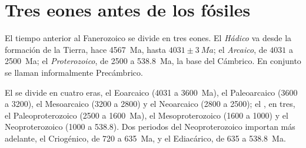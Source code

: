 \section{Tres eones antes de los fósiles}\label{sec:b2:precambrian-earth:eons}

\begin{definition}\label{def:b2:precambrian-earth:eons}
El tiempo anterior al Fanerozoico se divide en tres eones. El \emph{Hádico}
va desde la formación de la Tierra, hace \qty{4567}{Ma}, hasta $4031 \pm \qty{3}{Ma}$; el
\emph{Arcaico}, de $4031$ a \qty{2500}{Ma}; el
\emph{Proterozoico}, de 2500 a \qty{538.8}{Ma}, la base del Cámbrico.
En conjunto se llaman informalmente Precámbrico.
\end{definition}

El  se divide en cuatro eras, el Eoarcaico (4031 a \qty{3600}{Ma}), el Paleoarcaico (3600
a 3200), el Mesoarcaico (3200 a 2800) y el Neoarcaico (2800 a 2500); el , en tres,
el Paleoproterozoico (2500 a \qty{1600}{Ma}), el Mesoproterozoico (1600 a 1000) y el
Neoproterozoico (1000 a 538.8). Dos periodos del Neoproterozoico importan más adelante, el Criogénico, de 720 a
\qty{635}{Ma}, y el Ediacárico, de 635 a \qty{538.8}{Ma}.

